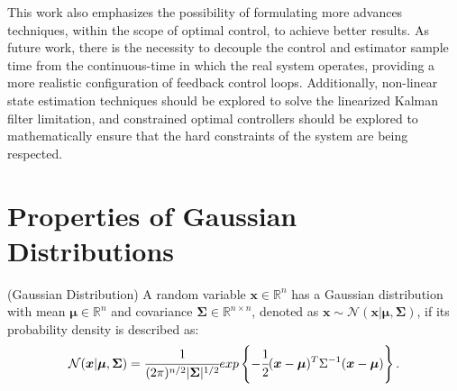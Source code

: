 \documentclass[a4paper,11pt]{book}
\numberwithin{figure}{chapter}
\numberwithin{equation}{chapter}
\numberwithin{table}{chapter}
\theoremstyle{definition}
\newtheorem{definition}{Definition}[chapter]
\newcounter{boxed-theorem}
\newcounter{boxed-lemma}
\newcounter{boxed-definition}
\newenvironment{boxed-definition}[1]
{\colorlet{shadecolor}{pastelYellow!15} \begin{shaded} \begin{definition}{#1}}
{\end{definition} \end{shaded}}
\newcounter{boxed-example}
\begin{document}
This work also emphasizes the possibility of formulating more advances techniques, within the scope of optimal control, to achieve better results. As future work, there is the necessity to decouple the control and estimator sample time from the continuous-time in which the real system operates, providing a more realistic configuration of feedback control loops. Additionally, non-linear state estimation techniques should be explored to solve the linearized Kalman filter limitation, and constrained optimal controllers should be explored to mathematically ensure that the hard constraints of the system are being respected.

\clearpage
{}




\clearpage
\appendix
\chapter{Properties of Gaussian Distributions}

\begin{boxed-definition}{(Gaussian Distribution)} \label{def:gauss}
	A random variable $\bm{x} \in \mathbb{R}^n$ has a Gaussian distribution with mean $\bm{\mu} \in \mathbb{R}^n$ and covariance $\bm{\Sigma} \in \mathbb{R}^{n \times n}$, denoted as $\bm{x} \sim \mathcal{N}(\bm{x}|\bm{\mu}, \bm{\Sigma})$, if its probability density is described as:
	\begin{equation}
		\mathcal{N}(\bm{x}|\bm{\mu}, \bm{\Sigma}) = \cfrac{1}{(2\pi)^{n/2} | \bm{\Sigma} |^{1/2}} exp \left\{-\cfrac{1}{2} (\bm{x} - \bm{\mu})^T \Sigma^{-1} (\bm{x} - \bm{\mu}) \right\}
	.\end{equation}
\end{boxed-definition}
\end{document}
